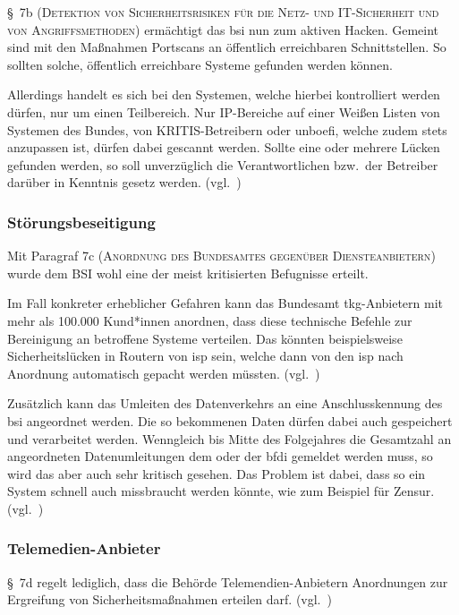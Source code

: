 §~7b (\textsc{Detektion von Sicherheitsrisiken für die Netz- und IT-Sicherheit und von Angriffsmethoden})
ermächtigt das \acrshort{bsi} nun zum aktiven Hacken.
Gemeint sind mit den Maßnahmen Portscans an öffentlich erreichbaren Schnittstellen.
So sollten solche, öffentlich erreichbare Systeme gefunden werden können.

Allerdings handelt es sich bei den Systemen, welche hierbei kontrolliert werden dürfen,
nur um einen Teilbereich.
Nur IP-Bereiche auf einer Weißen Listen von Systemen des Bundes, von KRITIS-Betreibern oder \acrshort{unboefi},
welche zudem stets anzupassen ist, dürfen dabei gescannt werden.
Sollte eine oder mehrere Lücken gefunden werden,
so soll unverzüglich die Verantwortlichen bzw.\ der Betreiber darüber in Kenntnis gesetz werden.
(vgl.~\cite{neue-it-sig-2.0})

\subsubsection{Störungsbeseitigung}\label{sssec:storungsbeseitigung}
Mit Paragraf 7c (\textsc{Anordnung des Bundesamtes gegenüber Diensteanbietern}) wurde dem BSI wohl eine der meist kritisierten Befugnisse erteilt.

Im Fall konkreter erheblicher Gefahren kann das Bundesamt \acrshort{tkg}-Anbietern mit mehr als 100.000 Kund*innen anordnen,
dass diese technische Befehle zur Bereinigung an betroffene Systeme verteilen.
Das könnten beispielsweise Sicherheitslücken in Routern von \acrshort{isp} sein,
welche dann von den \acrshort{isp} nach Anordnung automatisch gepacht werden müssten.
(vgl.~\cite{neue-it-sig-2.0})

Zusätzlich kann das Umleiten des Datenverkehrs an eine Anschlusskennung des \acrshort{bsi} angeordnet werden.
Die so bekommenen Daten dürfen dabei auch gespeichert und verarbeitet werden.
Wenngleich bis Mitte des Folgejahres die Gesamtzahl an angeordneten Datenumleitungen dem oder der \acrshort{bfdi} gemeldet werden muss,
so wird das aber auch sehr kritisch gesehen.
Das Problem ist dabei, dass so ein System schnell auch missbraucht werden könnte, wie zum Beispiel für Zensur.
(vgl.~\cite{neue-it-sig-2.0})

\subsubsection{Telemedien-Anbieter}\label{sssec:telemedien-anbieter}
§~7d regelt lediglich,
dass die Behörde Telemendien-Anbietern Anordnungen zur Ergreifung von Sicherheitsmaßnahmen erteilen darf.
(vgl.~\cite{neue-it-sig-2.0})

